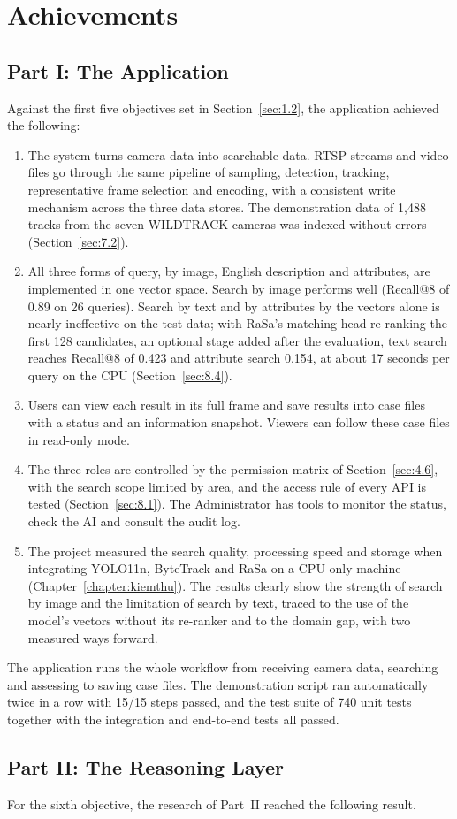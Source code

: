 \section{Achievements}
\label{sec:9.1}

\subsection{Part I: The Application}
\label{sec:12.1.1}

Against the first five objectives set in Section~\ref{sec:1.2}, the application achieved the following:
\begin{enumerate}
    \item The system turns camera data into searchable data. RTSP streams and video files go through the same pipeline of sampling, detection, tracking, representative frame selection and encoding, with a consistent write mechanism across the three data stores. The demonstration data of 1,488 tracks from the seven WILDTRACK cameras was indexed without errors (Section~\ref{sec:7.2}).
    \item All three forms of query, by image, English description and attributes, are implemented in one vector space. Search by image performs well (Recall@8 of 0.89 on 26 queries). Search by text and by attributes by the vectors alone is nearly ineffective on the test data; with RaSa's matching head re-ranking the first 128 candidates, an optional stage added after the evaluation, text search reaches Recall@8 of 0.423 and attribute search 0.154, at about 17 seconds per query on the CPU (Section~\ref{sec:8.4}).
    \item Users can view each result in its full frame and save results into case files with a status and an information snapshot. Viewers can follow these case files in read-only mode.
    \item The three roles are controlled by the permission matrix of Section~\ref{sec:4.6}, with the search scope limited by area, and the access rule of every API is tested (Section~\ref{sec:8.1}). The Administrator has tools to monitor the status, check the AI and consult the audit log.
    \item The project measured the search quality, processing speed and storage when integrating YOLO11n, ByteTrack and RaSa on a CPU-only machine (Chapter~\ref{chapter:kiemthu}). The results clearly show the strength of search by image and the limitation of search by text, traced to the use of the model's vectors without its re-ranker and to the domain gap, with two measured ways forward.
\end{enumerate}
The application runs the whole workflow from receiving camera data, searching and assessing to saving case files. The demonstration script ran automatically twice in a row with 15/15 steps passed, and the test suite of 740 unit tests together with the integration and end-to-end tests all passed.

\subsection{Part II: The Reasoning Layer}
\label{sec:12.1.2}

For the sixth objective, the research of Part~II reached the following result.


